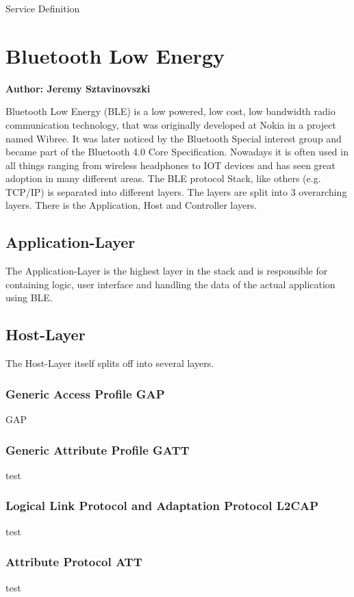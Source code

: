 Service Definition


\section{Bluetooth Low Energy}
\textbf{Author: Jeremy Sztavinovszki}

Bluetooth Low Energy (BLE) is a low powered, low cost, low bandwidth radio communication technology, that was originally developed at Nokia in a project named Wibree. It was later noticed by the Bluetooth Special interest group and became part of the Bluetooth 4.0 Core Specification. Nowadays it is often used in all things ranging from wireless headphones to IOT devices and has seen great adoption in many different areas. The BLE protocol Stack, like others (e.g. TCP/IP) is separated into different layers. The layers are split into 3 overarching layers. There is the Application, Host and Controller layers.

\subsection{Application-Layer}
The Application-Layer is the highest layer in the stack and is responsible for containing logic, user interface and handling the data of the actual application using BLE.

\subsection{Host-Layer}
The Host-Layer itself splits off into several layers.

\subsubsection{Generic Access Profile GAP}
GAP

\subsubsection{Generic Attribute Profile GATT}
test

\subsubsection{Logical Link Protocol and Adaptation Protocol L2CAP}
test

\subsubsection{Attribute Protocol ATT}
test

